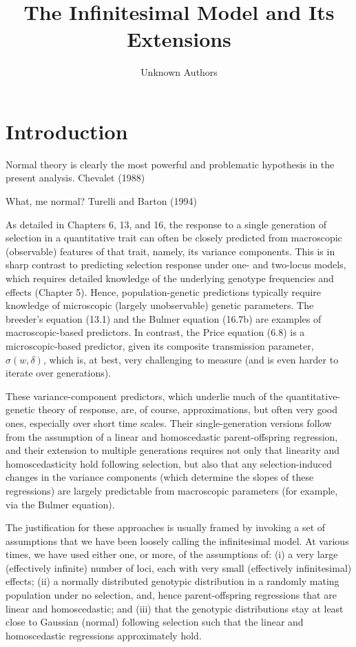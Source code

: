 \documentclass{article}
\title{The Infinitesimal Model and Its Extensions}
\author{Unknown Authors}
\date{}
\begin{document}
\maketitle

\begin{abstract}

\end{abstract}

\section{Introduction}
Normal theory is clearly the most powerful and problematic hypothesis in the present analysis. Chevalet (1988)

What, me normal? Turelli and Barton (1994)

As detailed in Chapters 6, 13, and 16, the response to a single generation of selection in a quantitative trait can often be closely predicted from macroscopic (observable) features of that trait, namely, its variance components. This is in sharp contrast to predicting selection response under one- and two-locus models, which requires detailed knowledge of the underlying genotype frequencies and effects (Chapter 5). Hence, population-genetic predictions typically require knowledge of microscopic (largely unobservable) genetic parameters. The breeder's equation (13.1) and the Bulmer equation (16.7b) are examples of macroscopic-based predictors. In contrast, the Price equation (6.8) is a microscopic-based predictor, given its composite transmission parameter,  $ \sigma(w, \delta) $, which is, at best, very challenging to measure (and is even harder to iterate over generations).

These variance-component predictors, which underlie much of the quantitative-genetic theory of response, are, of course, approximations, but often very good ones, especially over short time scales. Their single-generation versions follow from the assumption of a linear and homoscedastic parent-offspring regression, and their extension to multiple generations requires not only that linearity and homoscedasticity hold following selection, but also that any selection-induced changes in the variance components (which determine the slopes of these regressions) are largely predictable from macroscopic parameters (for example, via the Bulmer equation).

The justification for these approaches is usually framed by invoking a set of assumptions that we have been loosely calling the infinitesimal model. At various times, we have used either one, or more, of the assumptions of: (i) a very large (effectively infinite) number of loci, each with very small (effectively infinitesimal) effects; (ii) a normally distributed genotypic distribution in a randomly mating population under no selection, and, hence parent-offspring regressions that are linear and homoscedastic; and (iii) that the genotypic distributions stay at least close to Gaussian (normal) following selection such that the linear and homoscedastic regressions approximately hold.
\end{document}
